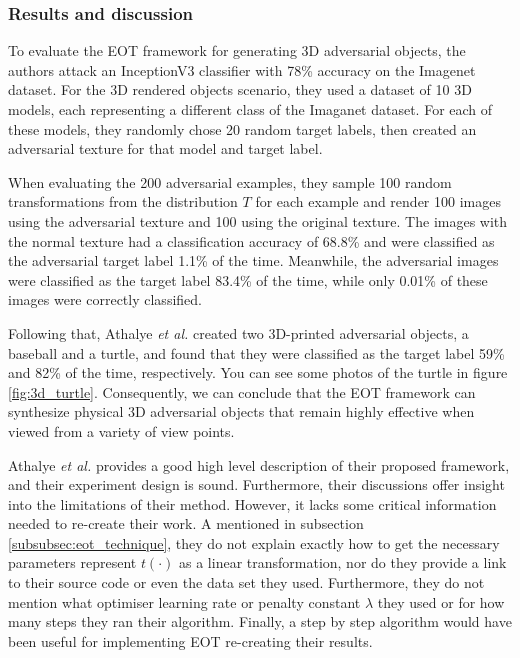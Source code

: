 \subsubsection{Results and discussion}

To evaluate the EOT framework for generating 3D adversarial objects, the authors attack an InceptionV3 classifier \cite{inceptionv3} with 78\% accuracy on the Imagenet dataset. For the 3D rendered objects scenario, they used a dataset of 10 3D models, each representing a different class of the Imaganet dataset. For each of these models, they randomly chose 20 random target labels, then created an adversarial texture for that model and target label. 

When evaluating the 200 adversarial examples, they sample 100 random transformations from the distribution $T$ for each example and render 100 images using the adversarial texture and 100 using the original texture. The images with the normal texture had a classification accuracy of 68.8\% and were classified as the adversarial target label 1.1\% of the time. Meanwhile, the adversarial images were classified as the target label 83.4\% of the time, while only 0.01\% of these images were correctly classified.

Following that, Athalye \textit{et al.} created two 3D-printed adversarial objects, a baseball and a turtle, and found that they were classified as the target label 59\% and 82\% of the time, respectively. You can see some photos of the turtle in figure \ref{fig:3d_turtle}. Consequently, we can conclude that the EOT framework can synthesize physical 3D adversarial objects that remain highly effective when viewed from a variety of view points.

Athalye \textit{et al.} \cite{athalye} provides a good high level description of their proposed framework, and their experiment design is sound. Furthermore, their discussions offer insight into the limitations of their method. However, it lacks some critical information needed to re-create their work. A mentioned in subsection \ref{subsubsec:eot_technique}, they do not explain exactly how to get the necessary parameters represent $t(\cdot)$ as a linear transformation, nor do they provide a link to their source code or even the data set they used. Furthermore, they do not mention what optimiser learning rate or penalty constant $\lambda$ they used or for how many steps they ran their algorithm. Finally, a step by step algorithm would have been useful for implementing EOT re-creating their results.

